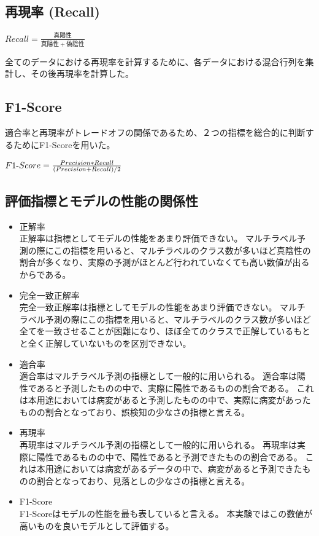 \subsection{再現率 (Recall)}
$Recall = \frac{真陽性}{真陽性+偽陰性}$

全てのデータにおける再現率を計算するために、各データにおける混合行列を集計し、その後再現率を計算した。
\subsection{F1-Score}
適合率と再現率がトレードオフの関係であるため、２つの指標を総合的に判断するためにF1-Scoreを用いた。

$F1{\rm \mathchar"712D}Score = \frac{Precision * Recall}{(Precision + Recall) / 2}$

\subsection{評価指標とモデルの性能の関係性}
\begin{itemize}
    \item 正解率\\
        正解率は指標としてモデルの性能をあまり評価できない。
        マルチラベル予測の際にこの指標を用いると、マルチラベルのクラス数が多いほど真陰性の割合が多くなり、実際の予測がほとんど行われていなくても高い数値が出るからである。
    \item 完全一致正解率\\
        完全一致正解率は指標としてモデルの性能をあまり評価できない。
        マルチラベル予測の際にこの指標を用いると、マルチラベルのクラス数が多いほど全てを一致させることが困難になり、ほぼ全てのクラスで正解しているもとと全く正解していないものを区別できない。
    \item 適合率\\
        適合率はマルチラベル予測の指標として一般的に用いられる。
        適合率は陽性であると予測したものの中で、実際に陽性であるものの割合である。
        これは本用途においては病変があると予測したものの中で、実際に病変があったものの割合となっており、誤検知の少なさの指標と言える。
    \item 再現率\\
        再現率はマルチラベル予測の指標として一般的に用いられる。
        再現率は実際に陽性であるものの中で、陽性であると予測できたものの割合である。
        これは本用途においては病変があるデータの中で、病変があると予測できたものの割合となっており、見落としの少なさの指標と言える。
    \item F1-Score\\
        F1-Scoreはモデルの性能を最も表していると言える。
        本実験ではこの数値が高いものを良いモデルとして評価する。
\end{itemize}

